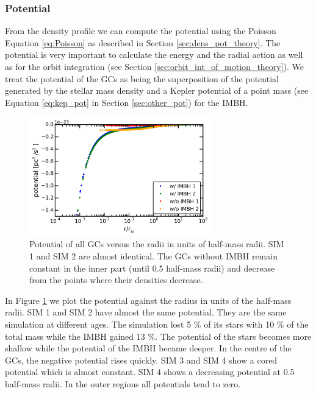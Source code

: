 \subsubsection{Potential}
\par From the density profile we can compute the potential using the Poisson Equation \eqref{eq:Poisson} as described in Section \ref{sec:dens_pot_theory}. The potential is very important to calculate the energy and the radial action as well as for the orbit integration (see Section \ref{sec:orbit_int_of_motion_theory}). We treat the potential of the \acp{GC} as being the superposition of the potential generated by the stellar mass density and a Kepler potential of a point mass (see Equation \eqref{eq:kep_pot} in Section \ref{sec:other_pot}) for the \ac{IMBH}.
\begin{figure}[htbp]
	\centering
	\includegraphics[width=0.7\textwidth]{Plots/potential.png}
	\caption{Potential of all \acp{GC} versus the radii in units of half-mass radii. SIM 1 and SIM 2 are almost identical. The \acp{GC} without \ac{IMBH} remain constant in the inner part (until 0.5 half-mass radii) and decrease from the points where their densities decrease.}
	\label{fig:potential}
\end{figure}

In Figure \ref{fig:potential} we plot the potential against the radius in units of the half-mass radii. SIM 1 and SIM 2 have almost the same potential. They are the same simulation at different ages. The simulation lost 5 \% of its stars with 10 \% of the total mass while the \ac{IMBH} gained 13 \%. The potential of the stars becomes more shallow while the potential of the \ac{IMBH} became deeper. In the centre of the \acp{GC}, the negative potential rises quickly. SIM 3 and SIM 4 show a cored potential which is almost constant. SIM 4 shows a decreasing potential at 0.5 half-mass radii. In the outer regions all potentials tend to zero.

